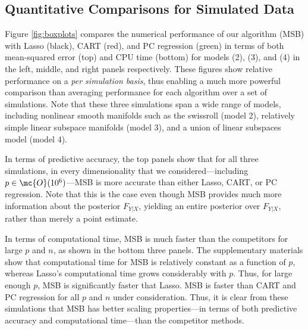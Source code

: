 \subsection{Quantitative Comparisons for Simulated Data} \label{sub:sim}

Figure \ref{fig:boxplots} compares the numerical performance of our algorithm (MSB) with Lasso (black), CART (red), and PC regression (green) in terms of both mean-squared error (top) and CPU time (bottom) for models (2), (3), and (4) in the left, middle, and right panels respectively. These figures show relative performance on a \emph{per simulation basis}, thus enabling a much more powerful comparison than averaging performance for each algorithm over a set of simulations.  Note that these three simulations span a wide range of models, including
nonlinear smooth manifolds such as the swissroll (model 2),
relatively simple linear subspace manifolds (model 3), 
and a union of linear subspaces model (model 4).

In terms of predictive accuracy, the top panels show that for all three simulations,  in every dimensionality that we considered---including $p \in \mc{O}(10^6)$---MSB is more accurate than either Lasso, CART, or PC regression.  Note that this is the case even though MSB provides much more information about the posterior $F_{Y|X}$, yielding an entire posterior over $F_{Y|X}$, rather than merely a point estimate.

In terms of computational time, MSB is much faster than the competitors for large $p$ and $n$, as shown in the bottom three panels.  The supplementary materials show that computational time for MSB is relatively constant as a function of $p$, whereas Lasso's computational time grows considerably with $p$.  Thus, for large enough $p$, MSB is significantly faster that Lasso.  MSB is faster than CART and PC regression for all $p$ and $n$ under consideration.  Thus, it is clear from these simulations that MSB has better scaling properties---in terms of both predictive accuracy and computational time---than the competitor methods. 




